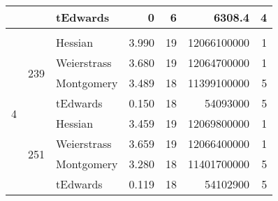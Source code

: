 \begin{table}[!h]
\begin{tabular}{lllrrrr}
\multicolumn{1}{|l|}{}                   & \multicolumn{1}{l|}{}                     & \multicolumn{1}{l|}{tEdwards}    & \multicolumn{1}{r|}{0}     & \multicolumn{1}{r|}{6}    & \multicolumn{1}{r|}{6308.4}      & \multicolumn{1}{r|}{4}    \\ \hline \vspace{-3.2mm}
                                         &                                           &                                  &                            &                           &                                  &                           \\ \hline
\multicolumn{1}{|l|}{\multirow{8}{*}{4}} & \multicolumn{1}{l|}{\multirow{4}{*}{239}} & \multicolumn{1}{l|}{Hessian}     & \multicolumn{1}{r|}{3.990}  & \multicolumn{1}{r|}{19}   & \multicolumn{1}{r|}{12066100000} & \multicolumn{1}{r|}{1}    \\ \cline{3-7} 
\multicolumn{1}{|l|}{}                   & \multicolumn{1}{l|}{}                     & \multicolumn{1}{l|}{Weierstrass} & \multicolumn{1}{r|}{3.680}  & \multicolumn{1}{r|}{19}   & \multicolumn{1}{r|}{12064700000} & \multicolumn{1}{r|}{1}    \\ \cline{3-7} 
\multicolumn{1}{|l|}{}                   & \multicolumn{1}{l|}{}                     & \multicolumn{1}{l|}{Montgomery}  & \multicolumn{1}{r|}{3.489} & \multicolumn{1}{r|}{18}   & \multicolumn{1}{r|}{11399100000} & \multicolumn{1}{r|}{5}    \\ \cline{3-7} 
\multicolumn{1}{|l|}{}                   & \multicolumn{1}{l|}{}                     & \multicolumn{1}{l|}{tEdwards}    & \multicolumn{1}{r|}{0.150} & \multicolumn{1}{r|}{18}   & \multicolumn{1}{r|}{54093000}    & \multicolumn{1}{r|}{5}    \\ \cline{2-7} 
\multicolumn{1}{|l|}{}                   & \multicolumn{1}{l|}{\multirow{4}{*}{251}} & \multicolumn{1}{l|}{Hessian}     & \multicolumn{1}{r|}{3.459} & \multicolumn{1}{r|}{19}   & \multicolumn{1}{r|}{12069800000} & \multicolumn{1}{r|}{1}    \\ \cline{3-7} 
\multicolumn{1}{|l|}{}                   & \multicolumn{1}{l|}{}                     & \multicolumn{1}{l|}{Weierstrass} & \multicolumn{1}{r|}{3.659} & \multicolumn{1}{r|}{19}   & \multicolumn{1}{r|}{12066400000} & \multicolumn{1}{r|}{1}    \\ \cline{3-7} 
\multicolumn{1}{|l|}{}                   & \multicolumn{1}{l|}{}                     & \multicolumn{1}{l|}{Montgomery}  & \multicolumn{1}{r|}{3.280} & \multicolumn{1}{r|}{18}   & \multicolumn{1}{r|}{11401700000} & \multicolumn{1}{r|}{5}    \\ \cline{3-7} 
\multicolumn{1}{|l|}{}                   & \multicolumn{1}{l|}{}                     & \multicolumn{1}{l|}{tEdwards}    & \multicolumn{1}{r|}{0.119} & \multicolumn{1}{r|}{18}   & \multicolumn{1}{r|}{54102900}    & \multicolumn{1}{r|}{5}    \\ \hline
\end{tabular}
\end{table}